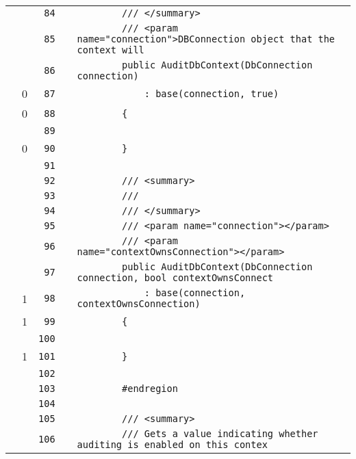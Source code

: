 \documentclass[a4paper,10pt]{article}
\begin{document}
\begin{longtable}[l]{lrrll}
\cellcolor{gray} &  & \verb~84~ & & \verb~        /// </summary>~\\
\cellcolor{gray} &  & \verb~85~ & & \verb~        /// <param name="connection">DBConnection object that the context will~\\
\cellcolor{gray} &  & \verb~86~ & & \verb~        public AuditDbContext(DbConnection connection)~\\
\cellcolor{red} & 0 & \verb~87~ & & \verb~            : base(connection, true)~\\
\cellcolor{red} & 0 & \verb~88~ & & \verb~        {~\\
\cellcolor{gray} &  & \verb~89~ & & \verb~~\\
\cellcolor{red} & 0 & \verb~90~ & & \verb~        }~\\
\cellcolor{gray} &  & \verb~91~ & & \verb~~\\
\cellcolor{gray} &  & \verb~92~ & & \verb~        /// <summary>~\\
\cellcolor{gray} &  & \verb~93~ & & \verb~        ///~\\
\cellcolor{gray} &  & \verb~94~ & & \verb~        /// </summary>~\\
\cellcolor{gray} &  & \verb~95~ & & \verb~        /// <param name="connection"></param>~\\
\cellcolor{gray} &  & \verb~96~ & & \verb~        /// <param name="contextOwnsConnection"></param>~\\
\cellcolor{gray} &  & \verb~97~ & & \verb~        public AuditDbContext(DbConnection connection, bool contextOwnsConnect~\\
\cellcolor{green} & 1 & \verb~98~ & & \verb~            : base(connection, contextOwnsConnection)~\\
\cellcolor{green} & 1 & \verb~99~ & & \verb~        {~\\
\cellcolor{gray} &  & \verb~100~ & & \verb~~\\
\cellcolor{green} & 1 & \verb~101~ & & \verb~        }~\\
\cellcolor{gray} &  & \verb~102~ & & \verb~~\\
\cellcolor{gray} &  & \verb~103~ & & \verb~        #endregion~\\
\cellcolor{gray} &  & \verb~104~ & & \verb~~\\
\cellcolor{gray} &  & \verb~105~ & & \verb~        /// <summary>~\\
\cellcolor{gray} &  & \verb~106~ & & \verb~        /// Gets a value indicating whether auditing is enabled on this contex~\\

\end{longtable}
\end{document}
